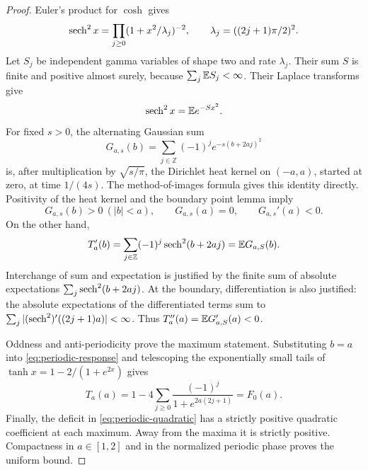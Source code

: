 \begin{proof}
Euler's product for $\cosh$ gives
\[
 \operatorname{sech}^2x=\prod_{j\ge0}(1+x^2/\lambda_j)^{-2},\qquad
 \lambda_j=((2j+1)\pi/2)^2.
\]
Let $S_j$ be independent gamma variables of shape two and rate
$\lambda_j$. Their sum $S$ is finite and positive almost surely,
because $\sum_j\mathbb E S_j<\infty$. Their Laplace transforms give
\begin{equation}\label{eq:sech-gaussian-mixture}
 \operatorname{sech}^2x=\mathbb E e^{-Sx^2}.
\end{equation}
For fixed $s>0$, the alternating Gaussian sum
\[
 G_{a,s}(b)=\sum_{j\in\mathbb Z}(-1)^j e^{-s(b+2aj)^2}
\]
is, after multiplication by $\sqrt{s/\pi}$, the Dirichlet heat kernel
on $(-a,a)$, started at zero, at time $1/(4s)$. The method-of-images
formula gives this identity directly. Positivity of the heat kernel
and the boundary point lemma imply
\[
 G_{a,s}(b)>0\ (|b|<a),\qquad G_{a,s}(a)=0,\qquad
 G_{a,s}'(a)<0.
\]
On the other hand,
\[
 T_a'(b)=\sum_{j\in\mathbb Z}(-1)^j\operatorname{sech}^2(b+2aj)
         =\mathbb E G_{a,S}(b).
\]
Interchange of sum and expectation is justified by the finite sum of
absolute expectations $\sum_j\operatorname{sech}^2(b+2aj)$. At the boundary,
differentiation is also justified: the absolute expectations of the
differentiated terms sum to
$\sum_j| (\operatorname{sech}^2)'((2j+1)a)|<\infty$.
Thus $T_a''(a)=\mathbb E G_{a,S}'(a)<0$.

Oddness and anti-periodicity prove the maximum statement. Substituting
$b=a$ into \eqref{eq:periodic-response} and telescoping the exponentially
small tails of $\tanh x=1-2/(1+e^{2x})$ gives
\[
 T_a(a)=1-4\sum_{j\ge0}\frac{(-1)^j}{1+e^{2a(2j+1)}}=F_0(a).
\]
Finally, the deficit in \eqref{eq:periodic-quadratic} has a strictly
positive quadratic coefficient at each maximum. Away from the maxima
it is strictly positive. Compactness in $a\in[1,2]$ and in the
normalized periodic phase proves the uniform bound.
\end{proof}

